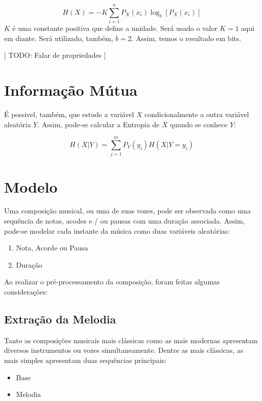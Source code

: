 \begin{equation}
    H(X) = - K \sum_{i=1}^{n} P_X(x_i) \log_b{[P_X(x_i)]}
\end{equation}
$K$ é uma constante positiva que define a unidade. Será usado o valor $K=1$ aqui em diante. Será utilizado, também, $b=2$. Assim, temos o resultado em bits.

[ TODO: Falar de propriedades ]

\section{Informação Mútua}

É possivel, também, que estude a variável $X$ condicionalmente a outra variável aleatória $Y$. Assim, pode-se calcular a Entropia de $X$ quando se conhece $Y$:

\begin{equation}
    H(X|Y) =  \sum_{j=1}^{m} P_Y(y_i) H(X|Y = y_i)
\end{equation}


\section{Modelo}

Uma composição musical, ou uma de suas vozes, pode ser observada como uma sequência de notas, acodes e / ou pausas com uma duração associada. Assim, pode-se modelar cada instante da música como duas variáveis aleatórias:

\begin{enumerate}
    \item Nota, Acorde ou Pausa
    \item Duração
\end{enumerate}

Ao realizar o pré-processamento da composição, foram feitas algumas considerações:

\subsection{Extração da Melodia}

Tanto as composições musicais mais clássicas como as mais modernas apresentam diversos instrumentos ou vozes simultaneamente. Dentre as mais clássicas, as mais simples apresentam duas sequências principais:

\begin{itemize}
    \item Base
    \item Melodia
\end{itemize}

